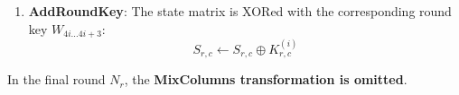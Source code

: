 \documentclass[11pt,a4paper]{article}
\DeclareMathOperator{\GF}{GF}
\begin{document}
\begin{enumerate}
\begin{equation}
\begin{bmatrix}
            02 & 03 & 01 & 01 \\
            01 & 02 & 03 & 01 \\
            01 & 01 & 02 & 03 \\
            03 & 01 & 01 & 02
        \end{bmatrix}
        \begin{bmatrix}
            s_{0,c} \\ s_{1,c} \\ s_{2,c} \\ s_{3,c}
        \end{bmatrix}
    \end{equation}
    All multiplications and additions are evaluated within $\GF(2^8)$. For decryption, the inverse matrix is used:
    \begin{equation}
        \begin{bmatrix}
            s'_{0,c} \\ s'_{1,c} \\ s'_{2,c} \\ s'_{3,c}
        \end{bmatrix} = 
        \begin{bmatrix}
            \mathtt{0x0E} & \mathtt{0x0B} & \mathtt{0x0D} & \mathtt{0x09} \\
            \mathtt{0x09} & \mathtt{0x0E} & \mathtt{0x0B} & \mathtt{0x0D} \\
            \mathtt{0x0D} & \mathtt{0x09} & \mathtt{0x0E} & \mathtt{0x0B} \\
            \mathtt{0x0B} & \mathtt{0x0D} & \mathtt{0x09} & \mathtt{0x0E}
        \end{bmatrix}
        \begin{bmatrix}
            s_{0,c} \\ s_{1,c} \\ s_{2,c} \\ s_{3,c}
        \end{bmatrix}
    \end{equation}
    \item \textbf{AddRoundKey}: The state matrix is XORed with the corresponding round key $W_{4i \dots 4i+3}$:
    \begin{equation}
        S_{r,c} \leftarrow S_{r,c} \oplus K_{r,c}^{(i)}
    \end{equation}
\end{enumerate}
In the final round $N_r$, the \textbf{MixColumns transformation is omitted}.
\end{document}

